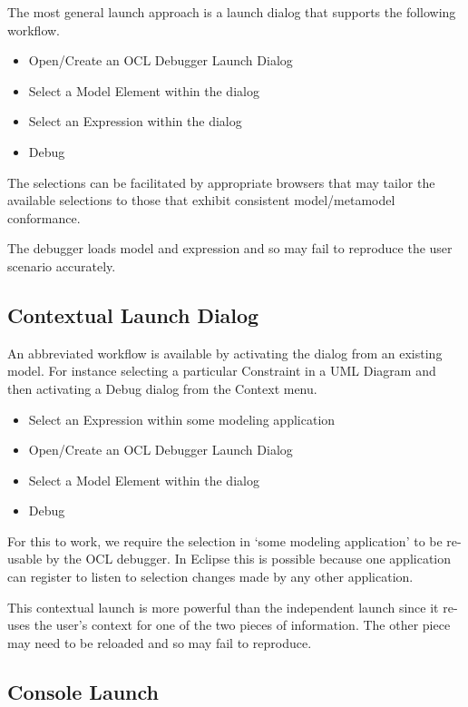 \documentclass[a4paper]{article}
\begin{document}
The most general launch approach is a launch dialog that supports the following workflow.

\begin{itemize}
\item Open/Create an OCL Debugger Launch Dialog
\item Select a Model Element within the dialog
\item Select an Expression within the dialog
\item Debug
\end{itemize}

The selections can be facilitated by appropriate browsers that may tailor the available selections to those that exhibit consistent model/metamodel conformance.

The debugger loads model and expression and so may fail to reproduce the user scenario accurately.

\subsection{Contextual Launch Dialog}

An abbreviated workflow is available by activating the dialog from an existing model. For instance selecting a particular Constraint in a UML Diagram and then activating a Debug dialog from the Context menu.

\begin{itemize}
\item Select an Expression within some modeling application
\item Open/Create an OCL Debugger Launch Dialog
\item Select a Model Element within the dialog
\item Debug
\end{itemize}

For this to work, we require the selection in `some modeling application' to be re-usable by the OCL debugger. In Eclipse this is possible because one application can register to listen to selection changes made by any other application.

This contextual launch is more powerful than the independent launch since it re-uses the user's context for one of the two pieces of information. The other piece may need to be reloaded and so may fail to reproduce.

\subsection{Console Launch}
\end{document}
